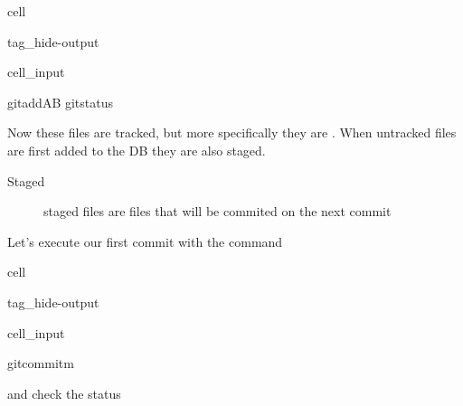 \documentclass[a4paper,10pt,english]{jupyterBook}
\begin{document}
\begin{sphinxuseclass}{cell}
\begin{sphinxuseclass}{tag_hide-output}\begin{sphinxVerbatimInput}

\begin{sphinxuseclass}{cell_input}
\begin{sphinxVerbatim}[commandchars=\\\{\}]
gitaddAB
gitstatus
\end{sphinxVerbatim}

\end{sphinxuseclass}\end{sphinxVerbatimInput}

\end{sphinxuseclass}
\end{sphinxuseclass}
\sphinxAtStartPar
Now these files are tracked, but more specifically they are . When untracked files are first added to the DB they are also staged.
\begin{description}
\item[{Staged}] \leavevmode
\sphinxAtStartPar
staged files are files that will be commited on the next commit

\end{description}

\sphinxAtStartPar
Let’s execute our first commit with the  command

\begin{sphinxuseclass}{cell}
\begin{sphinxuseclass}{tag_hide-output}\begin{sphinxVerbatimInput}

\begin{sphinxuseclass}{cell_input}
\begin{sphinxVerbatim}[commandchars=\\\{\}]
gitcommit\PYGZhy{}m
\end{sphinxVerbatim}

\end{sphinxuseclass}\end{sphinxVerbatimInput}

\end{sphinxuseclass}
\end{sphinxuseclass}
\sphinxAtStartPar
and check the status
\end{document}

